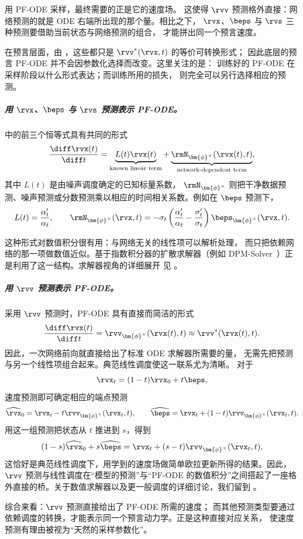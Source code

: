 用 PF-ODE 采样，最终需要的正是它的速度场。
这使得 $\rvv$ 预测格外直接：网络预测的就是
ODE 右端所出现的那个量。相比之下，
$\rvx$、$\beps$ 与 $\rvs$ 三种预测要借助当前状态与网络预测的组合，
才能拼出同一个预言速度。

在预言层面，由 ，这些都只是 $\rvv^*(\rvx,t)$ 的等价可转换形式；
因此底层的预言 PF-ODE 并不会因参数化选择而改变。这里关注的是：
训练好的 PF-ODE 在采样阶段以什么形式表达；而训练所用的损失，
则完全可以另行选择相应的预测。

\subparagraph{用 $\rvx$、$\beps$ 与 $\rvs$ 预测表示 PF-ODE。}
 中的前三个恒等式具有共同的形式
\[
\frac{\diff\rvx(t)}{\diff t}
=
\underbrace{L(t)\rvx(t)}_{\text{known linear term}}
+
\underbrace{\rmN_{\bm{\phi}^{\times}}(\rvx(t),t)}_{\text{network-dependent term}},
\]
其中 $L(t)$ 是由噪声调度确定的已知标量系数，
$\rmN_{\bm{\phi}^{\times}}$ 则把干净数据预测、噪声预测或分数预测乘以相应的时间相关系数。例如在 $\beps$ 预测下，
\[
L(t)
=
\frac{\alpha_t'}{\alpha_t},
\qquad
\rmN_{\bm{\phi}^{\times}}(\rvx,t)
=
-\sigma_t
\left(
\frac{\alpha_t'}{\alpha_t}
-
\frac{\sigma_t'}{\sigma_t}
\right)
\beps_{\bm{\phi}^{\times}}(\rvx,t).
\]

这种形式对数值积分很有用：与网络无关的线性项可以解析处理，
而只把依赖网络的那一项做数值近似。基于指数积分器的扩散求解器（例如
DPM-Solver~\citep{lu2022dpm}）正是利用了这一结构。求解器视角的详细展开
见 。

\subparagraph{用 $\rvv$ 预测表示 PF-ODE。}
采用 $\rvv$ 预测时，PF-ODE 具有直接而简洁的形式
\[
\frac{\diff\rvx(t)}{\diff t}
=
\rvv_{\bm{\phi}^{\times}}(\rvx(t),t)
\approx
\rvv^*(\rvx(t),t).
\]
因此，一次网络前向就直接给出了标准 ODE 求解器所需要的量，
无需先把预测与另一个线性项组合起来。典范线性调度使这一联系尤为清晰。
对于
\[
\rvx_t=(1-t)\rvx_0+t\beps,
\]
速度预测即可确定相应的端点预测
\[
\widehat{\rvx}_0
=
\rvx_t-t\rvv_{\bm{\phi}^{\times}}(\rvx_t,t),
\qquad
\widehat{\beps}
=
\rvx_t+(1-t)\rvv_{\bm{\phi}^{\times}}(\rvx_t,t).
\]
用这一组预测把状态从 $t$ 推进到 $s$，得到
\[
(1-s)\widehat{\rvx}_0+s\widehat{\beps}
=
\rvx_t
+
(s-t)\rvv_{\bm{\phi}^{\times}}(\rvx_t,t),
\]
这恰好是典范线性调度下，用学到的速度场做简单欧拉更新所得的结果。因此，$\rvv$ 预测与线性调度在“模型的预测”与“PF-ODE 的数值积分”之间搭起了一座格外直接的桥。关于数值求解器以及更一般调度的详细讨论，我们留到 。

综合来看：$\rvv$ 预测直接给出了 PF-ODE 所需的速度；
而其他预测类型要通过依赖调度的转换，才能表示同一个预言动力学。正是这种直接对应关系，
使速度预测有理由被视为“天然的采样参数化”。


